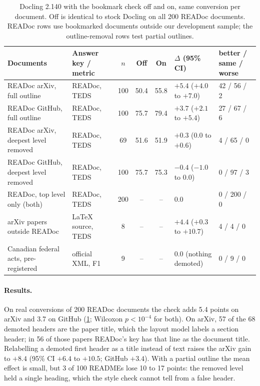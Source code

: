 \documentclass[10pt,twocolumn,letterpaper]{article}
\newcommand{\na}{--}
\begin{document}
\begin{table}[t]
\centering
\footnotesize
\setlength{\tabcolsep}{5pt}
\begin{tabular}{@{}llcccll@{}}
\toprule
Documents & Answer key / metric & $n$ & Off & On & $\Delta$ (95\% CI) & better / same / worse \\
\midrule
READoc arXiv, full outline           & READoc, TEDS & 100 & 50.4 & 55.8 & $+5.4$ ($+4.0$ to $+7.0$) & 42 / 56 / 2 \\
READoc GitHub, full outline          & READoc, TEDS & 100 & 75.7 & 79.4 & $+3.7$ ($+2.1$ to $+5.4$) & 27 / 67 / 6 \\
READoc arXiv, deepest level removed  & READoc, TEDS & 69  & 51.6 & 51.9 & $+0.3$ ($0.0$ to $+0.6$)  & 4 / 65 / 0 \\
READoc GitHub, deepest level removed & READoc, TEDS & 100 & 75.7 & 75.3 & $-0.4$ ($-1.0$ to $0.0$)  & 0 / 97 / 3 \\
READoc, top level only (both)        & READoc, TEDS & 200 & \na & \na & $0.0$                      & 0 / 200 / 0 \\
arXiv papers outside READoc          & \LaTeX{} source, TEDS & 8 & \na & \na & $+4.4$ ($+0.3$ to $+10.7$) & 4 / 4 / 0 \\
Canadian federal acts, pre-registered & official XML, F1 & 9 & \na & \na & $0.0$ (nothing demoted) & 0 / 9 / 0 \\
\bottomrule
\end{tabular}
\caption{Docling 2.140 with the bookmark check off and on, same conversion per document. Off is
identical to stock Docling on all 200 READoc documents. READoc rows use bookmarked documents outside
our development sample; the outline-removal rows test partial outlines.}
\label{tab:docling}
\end{table}

\paragraph{Results.} On real conversions of 200 READoc documents the check adds 5.4 points on arXiv
and 3.7 on GitHub (\cref{tab:docling}; Wilcoxon $p<10^{-4}$ for both). On arXiv, 57 of the 68
demoted headers are the paper title, which the layout model labels a section header; in 56 of those
papers READoc's key has that line as the document title. Relabelling a demoted first header as a
title instead of text raises the arXiv gain to $+8.4$ (95\% CI $+6.4$ to $+10.5$; GitHub $+3.4$).
With a partial outline the mean effect is small, but 3 of 100 READMEs lose 10 to 17 points: the
removed level held a single heading, which the style check cannot tell from a false header.
\end{document}
